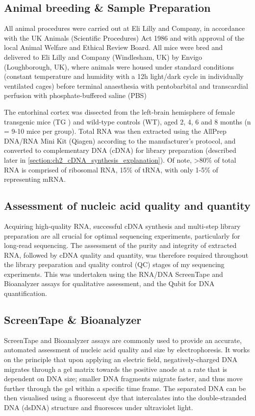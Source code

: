 \subsection{Animal breeding \& Sample Preparation}
\label{sec: animalbreeding_sample preparation}
All animal procedures were carried out at Eli Lilly and Company, in accordance with the UK Animals (Scientific Procedures) Act 1986 and with approval of the local Animal Welfare and Ethical Review Board. All mice were bred and delivered to Eli Lilly and Company (Windlesham, UK) by Envigo (Loughborough, UK), where animals were housed under standard conditions (constant temperature and humidity with a 12h light/dark cycle in individually ventilated cages) before terminal anaesthesia with pentobarbital and transcardial perfusion with phosphate-buffered saline (PBS)\cite{Castanho2020}

The entorhinal cortex was dissected from the left-brain hemisphere of female transgenic mice (TG ) and wild-type controls (WT), aged 2, 4, 6 and 8 months (n = 9-10 mice per group). Total RNA was then extracted\cite{Castanho2020} using the AllPrep DNA/RNA Mini Kit (Qiagen) according to the manufacturer's protocol, and converted to complementary DNA (cDNA) for library preparation (described later in \cref{section:ch2_cDNA_synthesis_explanation}). Of note, >80\% of total RNA is comprised of ribosomal RNA, 15\% of tRNA, with only 1-5\% of representing mRNA. 

\subsection{Assessment of nucleic acid quality and quantity}
Acquiring high-quality RNA, successful cDNA synthesis and multi-step library preparation are all crucial for optimal sequencing experiments, particularly for long-read sequencing. The assessment of the purity and integrity of extracted RNA, followed by cDNA quality and quantity, was therefore required throughout the library preparation and quality control (QC) stages of my sequencing experiments. This was undertaken using the RNA/DNA ScreenTape and Bioanalyzer assays for qualitative assessment, and the Qubit for DNA quantification. 


\subsection{ScreenTape \& Bioanalyzer}
\label{section:ch2_bioanalyzer} 
ScreenTape and Bioanalyzer assays are commonly used to provide an accurate, automated assessment of nucleic acid quality and size by electrophoresis. It works on the principle that upon applying an electric field, negatively-charged DNA migrates through a gel matrix towards the positive anode at a rate that is dependent on DNA size; smaller DNA fragments migrate faster, and thus move further through the gel within a specific time frame. The separated DNA can be then visualised using a fluorescent dye that intercalates into the double-stranded DNA (dsDNA) structure and fluoresces under ultraviolet light. 

